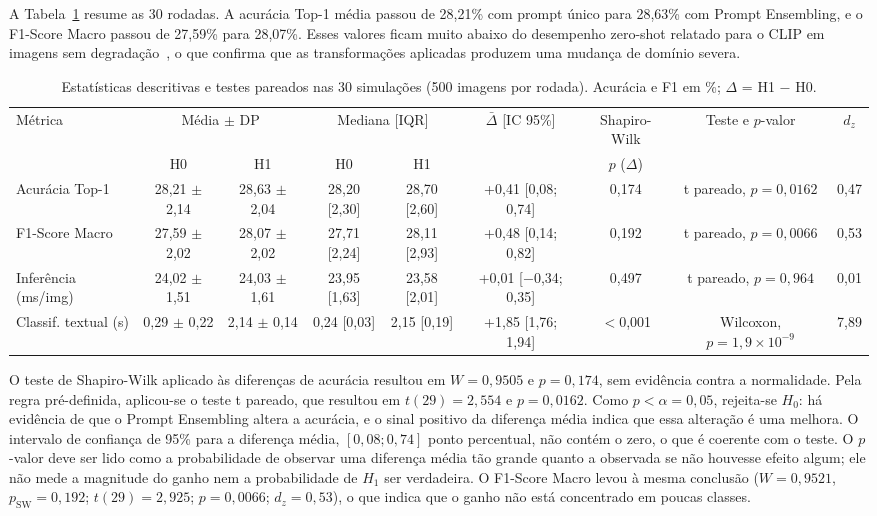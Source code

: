 \documentclass[conference]{IEEEtran}
\begin{document}
A Tabela~\ref{tab:resultados} resume as 30 rodadas. A acurácia Top-1 média passou de 28,21\% com prompt único para 28,63\% com Prompt Ensembling, e o F1-Score Macro passou de 27,59\% para 28,07\%. Esses valores ficam muito abaixo do desempenho zero-shot relatado para o CLIP em imagens sem degradação~\cite{radford2021}, o que confirma que as transformações aplicadas produzem uma mudança de domínio severa.

\begin{table}[!t]
\centering
\caption{Estatísticas descritivas e testes pareados nas 30 simulações (500 imagens por rodada). Acurácia e F1 em \%; $\Delta$ = H1 $-$ H0.}
\label{tab:resultados}
\footnotesize
\setlength{\tabcolsep}{3.5pt}
\begin{adjustbox}{max width=\textwidth}
\begin{tabular}{lcccccccc}
\toprule
\multirow{2}{*}{Métrica} & \multicolumn{2}{c}{Média $\pm$ DP} & \multicolumn{2}{c}{Mediana [IQR]} & \multirow{2}{*}{$\bar{\Delta}$ [IC 95\%]} & Shapiro-Wilk & \multirow{2}{*}{Teste e $p$-valor} & \multirow{2}{*}{$d_z$} \\
\cmidrule(lr){2-3} \cmidrule(lr){4-5}
 & H0 & H1 & H0 & H1 & & $p$ ($\Delta$) & & \\
\midrule
Acurácia Top-1 & 28,21 $\pm$ 2,14 & 28,63 $\pm$ 2,04 & 28,20 [2,30] & 28,70 [2,60] & +0,41 [0,08; 0,74] & 0,174 & t pareado, $p = 0{,}0162$ & 0,47 \\
F1-Score Macro & 27,59 $\pm$ 2,02 & 28,07 $\pm$ 2,02 & 27,71 [2,24] & 28,11 [2,93] & +0,48 [0,14; 0,82] & 0,192 & t pareado, $p = 0{,}0066$ & 0,53 \\
Inferência (ms/img) & 24,02 $\pm$ 1,51 & 24,03 $\pm$ 1,61 & 23,95 [1,63] & 23,58 [2,01] & +0,01 [$-$0,34; 0,35] & 0,497 & t pareado, $p = 0{,}964$ & 0,01 \\
Classif. textual (s) & 0,29 $\pm$ 0,22 & 2,14 $\pm$ 0,14 & 0,24 [0,03] & 2,15 [0,19] & +1,85 [1,76; 1,94] & $<$0,001 & Wilcoxon, $p = 1{,}9 \times 10^{-9}$ & 7,89 \\
\bottomrule
\end{tabular}
\end{adjustbox}
\end{table}

O teste de Shapiro-Wilk aplicado às diferenças de acurácia resultou em $W = 0{,}9505$ e $p = 0{,}174$, sem evidência contra a normalidade. Pela regra pré-definida, aplicou-se o teste t pareado, que resultou em $t(29) = 2{,}554$ e $p = 0{,}0162$. Como $p < \alpha = 0{,}05$, rejeita-se $H_0$: há evidência de que o Prompt Ensembling altera a acurácia, e o sinal positivo da diferença média indica que essa alteração é uma melhora. O intervalo de confiança de 95\% para a diferença média, $[0{,}08; 0{,}74]$ ponto percentual, não contém o zero, o que é coerente com o teste. O $p$-valor deve ser lido como a probabilidade de observar uma diferença média tão grande quanto a observada se não houvesse efeito algum; ele não mede a magnitude do ganho nem a probabilidade de $H_1$ ser verdadeira. O F1-Score Macro levou à mesma conclusão ($W = 0{,}9521$, $p_{\mathrm{SW}} = 0{,}192$; $t(29) = 2{,}925$; $p = 0{,}0066$; $d_z = 0{,}53$), o que indica que o ganho não está concentrado em poucas classes.
\end{document}

